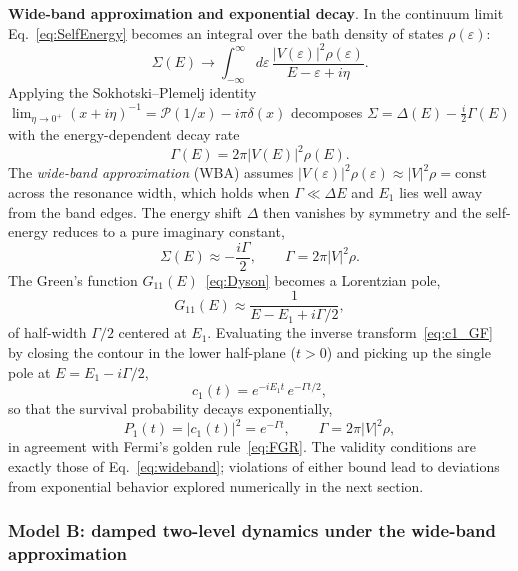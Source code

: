 \documentclass[aps,prx,reprint,showpacs,showkeys,floatfix]{revtex4-2}
\begin{document}
{\bf Wide-band approximation and exponential decay}. In the continuum limit Eq.~\eqref{eq:SelfEnergy} becomes an integral over
the bath density of states $\rho(\varepsilon)$:
\begin{equation}
    \Sigma(E) \to \int_{-\infty}^{\infty}d\varepsilon\,
                  \frac{|V(\varepsilon)|^2\rho(\varepsilon)}{E-\varepsilon+i\eta}.
    \label{eq:SigmaCont}
\end{equation}
Applying the Sokhotski--Plemelj identity
$\lim_{\eta\to 0^+}(x+i\eta)^{-1} = \mathcal{P}(1/x) - i\pi\delta(x)$
decomposes $\Sigma = \Delta(E) - \tfrac{i}{2}\Gamma(E)$ with the
energy-dependent decay rate
\begin{equation}
    \Gamma(E) = 2\pi|V(E)|^2\rho(E).
    \label{eq:GammaE}
\end{equation}
The \emph{wide-band approximation} (WBA) assumes
$|V(\varepsilon)|^2\rho(\varepsilon)\approx|V|^2\rho=\mathrm{const}$
across the resonance width, which holds when $\Gamma\ll\Delta E$ and $E_1$
lies well away from the band edges.  The energy shift $\Delta$ then vanishes
by symmetry and the self-energy reduces to a pure imaginary constant,
\begin{equation}
    \Sigma(E) \approx -\frac{i\Gamma}{2}, \qquad
    \Gamma = 2\pi|V|^2\rho.
    \label{eq:WBA}
\end{equation}
The Green's function $G_{11}(E)$~\eqref{eq:Dyson} becomes a Lorentzian pole,
\begin{equation}
    G_{11}(E) \approx \frac{1}{E - E_1 + i\Gamma/2},
    \label{eq:GLorentz}
\end{equation}
of half-width $\Gamma/2$ centered at $E_1$.  Evaluating the inverse
transform~\eqref{eq:c1_GF} by closing the contour in the lower half-plane
($t>0$) and picking up the single pole at $E=E_1-i\Gamma/2$,
\begin{equation}
    c_1(t) = e^{-iE_1 t}\,e^{-\Gamma t/2},
    \label{eq:c1_exp}
\end{equation}
so that the survival probability decays exponentially,
\begin{equation}
    P_1(t) = |c_1(t)|^2 = e^{-\Gamma t},
    \qquad \Gamma = 2\pi|V|^2\rho,
    \label{eq:FGR_pred}
\end{equation}
in agreement with Fermi's golden rule~\eqref{eq:FGR}.  The validity
conditions are exactly those of Eq.~\eqref{eq:wideband}; violations of
either bound lead to deviations from exponential behavior explored
numerically in the next section.

\subsubsection{Model B: damped two-level dynamics under the wide-band approximation}
\end{document}
